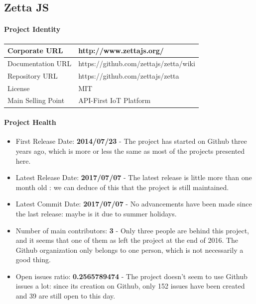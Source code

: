 \documentclass{article}
\begin{document}
\subsection{Zetta JS}

\paragraph{Project Identity}

\begin{center}
\begin{tabular}{|l|l|}
\hline
Corporate URL & http://www.zettajs.org/ \\ \hline
Documentation URL & https://github.com/zettajs/zetta/wiki \\ \hline
Repository URL & https://github.com/zettajs/zetta \\ \hline
License & MIT \\ \hline
Main Selling Point & API-First IoT Platform \\ \hline
\end{tabular}
\end{center}

\paragraph{Project Health}

\begin{itemize}
\item First Release Date: \textbf{2014/07/23} - The project has started on Github three years ago, which is more or less the same as most of the projects presented here.
\item Latest Release Date: \textbf{2017/07/07} - The latest release is little more than one month old : we can deduce of this that the project is still maintained.
\item Latest Commit Date: \textbf{2017/07/07} - No advancements have been made since the last release: maybe is it due to summer holidays.
\item Number of main contributors: \textbf{3} - Only three people are behind this project, and it seems that one of them as left the project at the end of 2016. The Github organization only belongs to one person, which is not necessarily a good thing.
\item Open issues ratio: \textbf{0.2565789474} - The project doesn't seem to use Github issues a lot: since its creation on Github, only 152 issues have been created and 39 are still open to this day.
\end{itemize}
\end{document}

